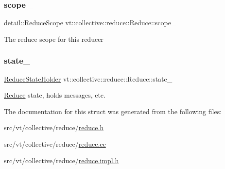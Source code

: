 \subsubsection{\texorpdfstring{scope\+\_\+}{scope\_}}
{\footnotesize\ttfamily \hyperlink{structvt_1_1collective_1_1reduce_1_1detail_1_1_reduce_scope}{detail\+::\+Reduce\+Scope} vt\+::collective\+::reduce\+::\+Reduce\+::scope\+\_\+\hspace{0.3cm}{\ttfamily [private]}}

The reduce scope for this reducer \mbox{\label{structvt_1_1collective_1_1reduce_1_1_reduce_a49b9fcaf2f8b76d350d1e3b809add2aa}} 
\subsubsection{\texorpdfstring{state\+\_\+}{state\_}}
{\footnotesize\ttfamily \hyperlink{structvt_1_1collective_1_1reduce_1_1_reduce_state_holder}{Reduce\+State\+Holder} vt\+::collective\+::reduce\+::\+Reduce\+::state\+\_\+\hspace{0.3cm}{\ttfamily [private]}}

\hyperlink{structvt_1_1collective_1_1reduce_1_1_reduce}{Reduce} state, holds messages, etc. 

The documentation for this struct was generated from the following files\+:\begin{DoxyCompactItemize}
\item 
src/vt/collective/reduce/\hyperlink{reduce_8h}{reduce.\+h}\item 
src/vt/collective/reduce/\hyperlink{reduce_8cc}{reduce.\+cc}\item 
src/vt/collective/reduce/\hyperlink{reduce_8impl_8h}{reduce.\+impl.\+h}\end{DoxyCompactItemize}
